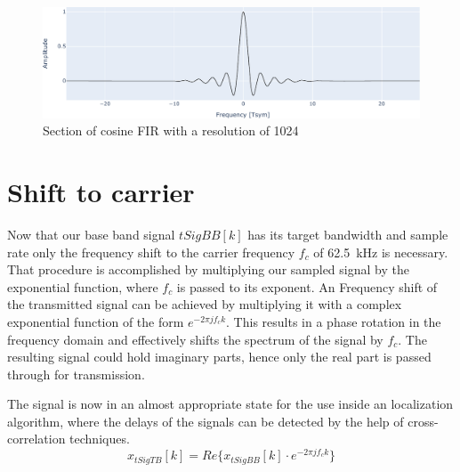 \begin{figure}[h]
	\includegraphics[width=\linewidth]{images/cosfir}
	\caption{Section of cosine FIR with a resolution of 1024}
	\label{fig:cosfir}
\end{figure}


\section{Shift to carrier}

Now that our base band signal $tSigBB[k]$ has its target bandwidth and sample rate only the frequency shift to the carrier frequency $f_c$ of \SI{62.5}{\kilo\hertz} is necessary. That procedure is accomplished by multiplying our sampled signal by the exponential function, where $f_c$ is passed to its exponent. An Frequency shift of the transmitted signal can be achieved by multiplying it with a complex exponential function of the form $e^{-2\pi j f_c k}$. This results in a phase rotation in the frequency domain and effectively shifts the spectrum of the signal by $f_c$. The resulting signal could hold imaginary parts, hence only the real part is passed through for transmission.

The signal is now in an almost appropriate state for the use inside an localization algorithm, where the delays of the signals can be detected by the help of cross-correlation techniques.
\begin{equation}
	x_{tSigTB}[k]=Re\{x_{tSigBB}[k]\cdot e^{-2\pi j f_c k}\}
	\label{eq:shift}
\end{equation}


